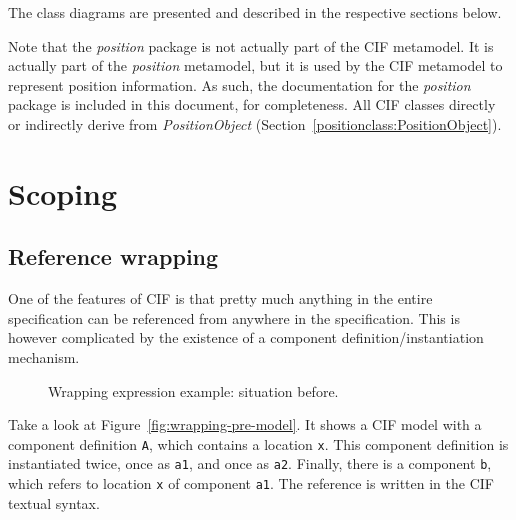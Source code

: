 \documentclass{report}
\newcommand{\positionclass}[1]{\textit{#1} (Section~\ref{positionclass:#1})}
\begin{document}
The class diagrams are presented and described in the respective sections
below.

Note that the \textit{position} package is not actually part of the CIF
metamodel. It is actually part of the \textit{position} metamodel, but it is
used by the CIF metamodel to represent position information. As such, the
documentation for the \textit{position} package is included in this document,
for completeness. All CIF classes directly or indirectly derive from
\positionclass{PositionObject}.


\section{Scoping}\label{sec:scoping}

\subsection{Reference wrapping}\label{sec:ref-wrapping}

One of the features of CIF is that pretty much anything in the entire
specification can be referenced from anywhere in the specification. This
is however complicated by the existence of a component
definition/instantiation mechanism.

\begin{figure}[!ht]
  \centering
  \hfill
  \caption{Wrapping expression example: situation before.}
  \label{fig:wrapping-pre}
\end{figure}

Take a look at Figure~\ref{fig:wrapping-pre-model}. It shows a CIF model with
a component definition \texttt{A}, which contains a location \texttt{x}. This
component definition is instantiated twice, once as \texttt{a1}, and once as
\texttt{a2}. Finally, there is a component \texttt{b}, which refers to
location \texttt{x} of component \texttt{a1}. The reference
is written in the CIF textual syntax.
\end{document}
